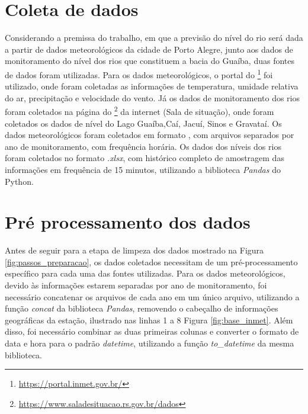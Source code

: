 \section{Coleta de dados}

Considerando a premissa do trabalho, em que a previsão do nível do rio será dada a partir de dados meteorológicos da cidade de Porto Alegre, junto aos dados de monitoramento do nível dos rios que constituem a bacia do Guaíba, duas fontes de dados foram utilizadas. Para os dados meteorológicos, o portal do \footnote{\url{https://portal.inmet.gov.br/}} foi utilizado, onde foram coletadas as informações de temperatura, umidade relativa do ar, precipitação e velocidade do vento. Já os dados de monitoramento dos rios foram coletados na página do \footnote{\url{https://www.saladesituacao.rs.gov.br/dados}} da internet (Sala de situação), onde foram coletados os dados de nível do Lago Guaíba,Caí, Jacuí, Sinos e Gravataí. Os dados meteorológicos foram coletados em formato , com arquivos separados por ano de monitoramento, com frequência horária. Os dados dos níveis dos rios foram coletados no formato \textit{.xlsx}, com histórico completo de amostragem das informações em frequência de 15 minutos, utilizando a biblioteca \textit{Pandas} do Python.

\section{Pré processamento dos dados}

Antes de seguir para a etapa de limpeza dos dados mostrado na Figura \ref{fig:passos_preparacao}, os dados coletados necessitam de um pré-processamento específico para cada uma das fontes utilizadas. Para os dados meteorológicos, devido às informações estarem separadas por ano de monitoramento, foi necessário concatenar os arquivos de cada ano em um único arquivo, utilizando a função \textit{concat} da biblioteca \textit{Pandas}, removendo o cabeçalho de informações geográficas da estação, ilustrado nas linhas 1 a 8 Figura \ref{fig:base_inmet}. Além disso, foi necessário combinar as duas primeiras colunas e converter o formato de data e hora para o padrão \textit{datetime}, utilizando a função \textit{to\_datetime} da mesma biblioteca. 

